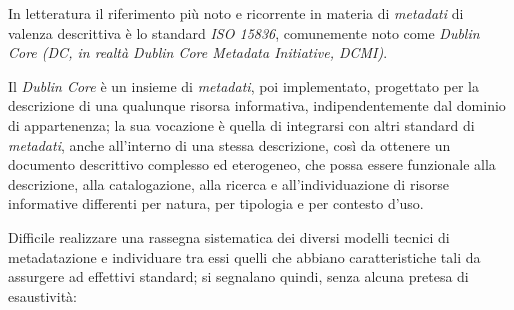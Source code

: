 \documentclass[
  b5paper,
  twoside,
  11pt,
  chapterprefix=false,
  bibliography=totocnumbered,
  parskip=0]{scrbook}
\begin{document}
In letteratura il riferimento più noto e ricorrente in materia di
\emph{metadati} di valenza descrittiva è lo standard \emph{ISO 15836}, comunemente
noto come \emph{Dublin Core (DC, in realtà Dublin Core Metadata Initiative,
DCMI)}.

Il \emph{Dublin Core} è un insieme di \emph{metadati}, poi implementato,
progettato per la descrizione di una qualunque risorsa informativa,
indipendentemente dal dominio di appartenenza; la sua vocazione è quella
di integrarsi con altri standard di \emph{metadati}, anche all'interno di una
stessa descrizione, così da ottenere un documento descrittivo complesso
ed eterogeneo, che possa essere funzionale alla descrizione, alla
catalogazione, alla ricerca e all'individuazione di risorse informative
differenti per natura, per tipologia e per contesto d'uso.

Difficile realizzare una rassegna sistematica dei diversi modelli
tecnici di metadatazione e individuare tra essi quelli che abbiano
caratteristiche tali da assurgere ad effettivi standard; si segnalano
quindi, senza alcuna pretesa di esaustività:
\end{document}
